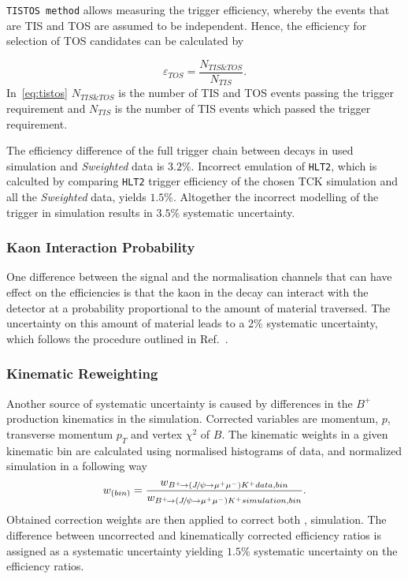 \texttt{TISTOS method} allows measuring the trigger efficiency, whereby the events that are \gls{TIS} and \gls{TOS} are assumed to be independent. Hence, the efficiency
for selection of \gls{TOS} candidates can be calculated by

\begin{equation}
\varepsilon_{TOS} = \frac{N_{TIS\&TOS}}{N_{TIS}}.
\label{eq:tistos}
\end{equation}
In~\autoref{eq:tistos} $N_{TIS\&TOS}$ is the number of \gls{TIS} and \gls{TOS} events passing the trigger requirement and $N_{TIS}$ is the number of \gls{TIS} events which passed the trigger requirement.

The efficiency difference of the full trigger chain between \bjpsik decays in used simulation and \textit{Sweighted} data is $3.2\%$. Incorrect emulation of \texttt{HLT2}, which is calculted by comparing \texttt{HLT2} trigger efficiency of the chosen TCK simulation and all the \textit{Sweighted} data, yields $1.5\%$. Altogether the incorrect modelling of the trigger in simulation results in $3.5\%$ systematic uncertainty.

\subsubsection{Kaon Interaction Probability}
One difference between the signal and the normalisation channels that can have effect on the efficiencies is that the kaon in the decay \bjpsimumuk can interact with the detector at a probability proportional to the amount of material traversed. The uncertainty on this amount of material leads to a 2\% systematic
uncertainty, which follows the procedure outlined in Ref.~\cite{LHCb-DP-2013-002}.

\subsubsection{Kinematic Reweighting}
Another source of systematic uncertainty is caused by differences in the $B^{+}$ production kinematics in the simulation. Corrected variables are momentum, $p$, transverse momentum $p_{T}$ and vertex $\chi^{2}$ of $B$. The kinematic weights in a given kinematic bin are calculated using normalised histograms of \bjpsimumuk data, and normalized \bjpsimumuk simulation in a following way
\begin{equation}
w_{(bin)} =  \frac{w_{{{{B}^+}}\!\rightarrow ({{J\mskip -3mu/\mskip -2mu\psi\mskip 2mu}}\!\rightarrow {\ensuremath{\mu^+\mu^-}}){{K}^+} data,bin}}{w_{{{{B}^+}}\!\rightarrow ({{J\mskip -3mu/\mskip -2mu\psi\mskip 2mu}}\!\rightarrow {\ensuremath{\mu^+\mu^-}}){{K}^+} simulation,bin}}.
\end{equation}
Obtained correction weights are then applied to correct both \bjpsimumuk, \Bmumumu simulation. The difference between uncorrected and kinematically corrected efficiency ratios is assigned as a systematic uncertainty yielding $1.5\%$ systematic uncertainty on the efficiency ratios.

